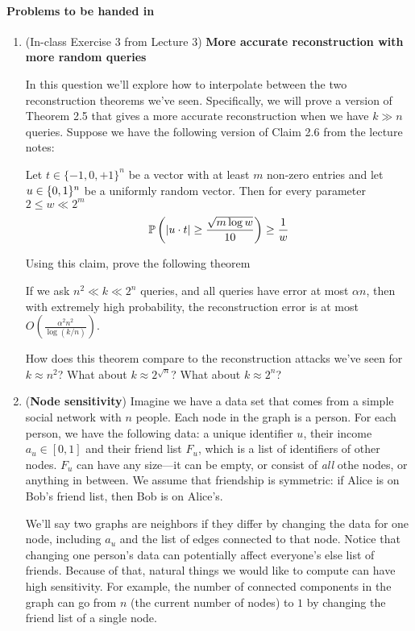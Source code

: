 \documentclass[11pt]{article}
\begin{document}
 \paragraph{Problems to be handed in}
\begin{enumerate}[leftmargin=\parindent, itemsep=3ex]

  
  

\item (In-class Exercise 3 from Lecture 3) \textbf{More accurate
    reconstruction with more random queries}

  In this question we'll explore how to interpolate between the two reconstruction theorems we've seen.  Specifically, we will prove a version of Theorem 2.5 that gives a more accurate reconstruction when we have $k \gg n$ queries.  Suppose we have the following version of Claim 2.6 from the lecture notes:
\begin{clm} 
	Let $t \in \{-1,0,+1\}^n$ be a vector with at least $m$ non-zero entries and let $u \in \{0,1\}^{n}$ be a uniformly random vector.  Then for every parameter $2 \leq w \ll  2^{m}$
	\begin{equation}
		{\operatorname*{\mathbb{P}}_{} {\left ( {| u \cdot t | \geq  \frac{\sqrt{m \log w}}{10}} \right)}} \geq \frac{1}{w}
	\end{equation}
\end{clm}
Using this claim, prove the following theorem
\begin{thm}
	If we ask $n^2 \ll k \ll 2^n$ queries, and all queries have error at most $\alpha n$, then with extremely high probability, the reconstruction error is at most $O(\frac{\alpha^2 n^2}{\log(k/n)})$.
\end{thm}

How does this theorem compare to the reconstruction attacks we've seen for $k \approx n^2$?  What about $k \approx 2^{\sqrt{n}}$?  What about $k \approx 2^n$?

\newpage
\item (\textbf{Node sensitivity}) Imagine we have a data set
  that comes from a simple social network with $n$ people. Each node in the graph is a
  person. For each person, we have the following data: a unique
  identifier $u$, their income $a_{u} \in [0,1]$
  and their friend list $F_{u}$, which is a list of identifiers
  of other nodes. $F_{u}$ can have any size---it can be empty, or
  consist of \emph{all} othe nodes, or anything in between. We
  assume that friendship is symmetric: if Alice is on Bob's friend
  list, then Bob is on Alice's.

  We'll say two graphs are neighbors if they differ by changing the
  data for one node, including $a_{u}$ and the list of edges connected
  to that node. Notice that changing one person's data can potentially
  affect everyone's else list of friends.
  Because of that, natural things
  we would like to compute can have high sensitivity. For example, the
  number of connected components in the graph can go from $n$ (the
  current number of nodes) to $1$
  by changing the friend list of  a single node. 
  

\end{enumerate}
\end{document}
